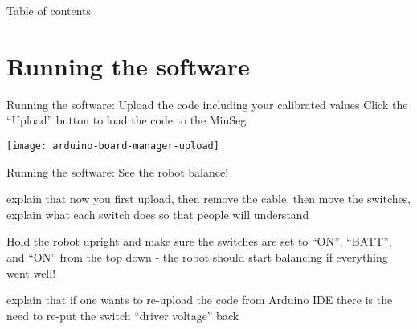 \begin{frame}{Table of contents}
	\tableofcontents
\end{frame}

\section{Running the software}

\begin{frame}{Running the software: Upload the code including your calibrated values}
	Click the ``Upload'' button to load the code to the MinSeg
	\begin{center}
		\texttt{[image: arduino-board-manager-upload]}
	\end{center}
\end{frame}





\begin{frame}{Running the software: See the robot balance!}

	explain that now you first upload, then remove the cable, then move the switches, explain what each switch does so that people will understand

	Hold the robot upright and make sure the switches are set to ``ON'', ``BATT'', and ``ON'' from the top down - the robot should start balancing if everything went well!
\end{frame}


explain that if one wants to re-upload the code from Arduino IDE there is the need to re-put the switch ``driver voltage'' back





\begin{frame}{}{}
	
\end{frame}




